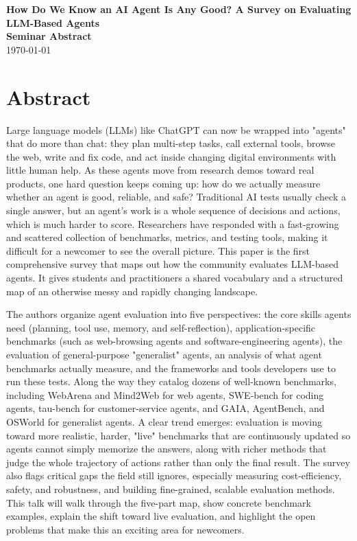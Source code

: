 \documentclass[12pt]{article}
\newcommand{\seminardate}{\today}
\begin{document}
\begin{center}
  {\LARGE\bfseries How Do We Know an AI Agent Is Any Good? A Survey on Evaluating LLM-Based Agents}\\[8pt]
  {\large\bfseries Seminar Abstract}\\[6pt]
  {\normalsize \seminardate}
\end{center}
\vspace{1.5em}

\section*{Abstract}
Large language models (LLMs) like ChatGPT can now be wrapped into "agents" that do more than chat: they plan multi-step tasks, call external tools, browse the web, write and fix code, and act inside changing digital environments with little human help. As these agents move from research demos toward real products, one hard question keeps coming up: how do we actually measure whether an agent is good, reliable, and safe? Traditional AI tests usually check a single answer, but an agent's work is a whole sequence of decisions and actions, which is much harder to score. Researchers have responded with a fast-growing and scattered collection of benchmarks, metrics, and testing tools, making it difficult for a newcomer to see the overall picture. This paper is the first comprehensive survey that maps out how the community evaluates LLM-based agents. It gives students and practitioners a shared vocabulary and a structured map of an otherwise messy and rapidly changing landscape.

The authors organize agent evaluation into five perspectives: the core skills agents need (planning, tool use, memory, and self-reflection), application-specific benchmarks (such as web-browsing agents and software-engineering agents), the evaluation of general-purpose "generalist" agents, an analysis of what agent benchmarks actually measure, and the frameworks and tools developers use to run these tests. Along the way they catalog dozens of well-known benchmarks, including WebArena and Mind2Web for web agents, SWE-bench for coding agents, tau-bench for customer-service agents, and GAIA, AgentBench, and OSWorld for generalist agents. A clear trend emerges: evaluation is moving toward more realistic, harder, "live" benchmarks that are continuously updated so agents cannot simply memorize the answers, along with richer methods that judge the whole trajectory of actions rather than only the final result. The survey also flags critical gaps the field still ignores, especially measuring cost-efficiency, safety, and robustness, and building fine-grained, scalable evaluation methods. This talk will walk through the five-part map, show concrete benchmark examples, explain the shift toward live evaluation, and highlight the open problems that make this an exciting area for newcomers.
\end{document}
